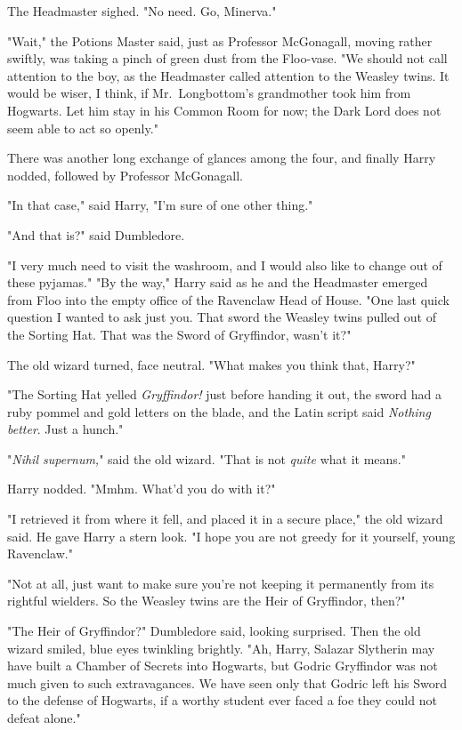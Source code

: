 The Headmaster sighed. "No need. Go, Minerva."

"Wait," the Potions Master said, just as Professor McGonagall, moving rather 
swiftly, was taking a pinch of green dust from the Floo-vase. "We should not 
call attention to the boy, as the Headmaster called attention to the Weasley 
twins. It would be wiser, I think, if Mr.~Longbottom's grandmother took him 
from Hogwarts. Let him stay in his Common Room for now; the Dark Lord does not 
seem able to act so openly."

There was another long exchange of glances among the four, and finally Harry 
nodded, followed by Professor McGonagall.

"In that case," said Harry, "I'm sure of one other thing."

"And that is?" said Dumbledore.

"I very much need to visit the washroom, and I would also like to change out of 
these pyjamas."
\sbreak
"By the way," Harry said as he and the Headmaster emerged from Floo into the 
empty office of the Ravenclaw Head of House. "One last quick question I wanted 
to ask just you. That sword the Weasley twins pulled out of the Sorting Hat. 
That was the Sword of Gryffindor, wasn't it?"

The old wizard turned, face neutral. "What makes you think that, Harry?"

"The Sorting Hat yelled\emph{ Gryffindor!} just before handing it out, the 
sword had a ruby pommel and gold letters on the blade, and the Latin script 
said \emph{Nothing better}. Just a hunch."

"\emph{Nihil supernum,}" said the old wizard. "That is not \emph{quite} what it 
means."

Harry nodded. "Mmhm. What'd you do with it?"

"I retrieved it from where it fell, and placed it in a secure place," the old 
wizard said. He gave Harry a stern look. "I hope you are not greedy for it 
yourself, young Ravenclaw."

"Not at all, just want to make sure you're not keeping it permanently from its 
rightful wielders. So the Weasley twins are the Heir of Gryffindor, then?"

"The Heir of Gryffindor?" Dumbledore said, looking surprised. Then the old 
wizard smiled, blue eyes twinkling brightly. "Ah, Harry, Salazar Slytherin may 
have built a Chamber of Secrets into Hogwarts, but Godric Gryffindor was not 
much given to such extravagances. We have seen only that Godric left his Sword 
to the defense of Hogwarts, if a worthy student ever faced a foe they could not 
defeat alone."

